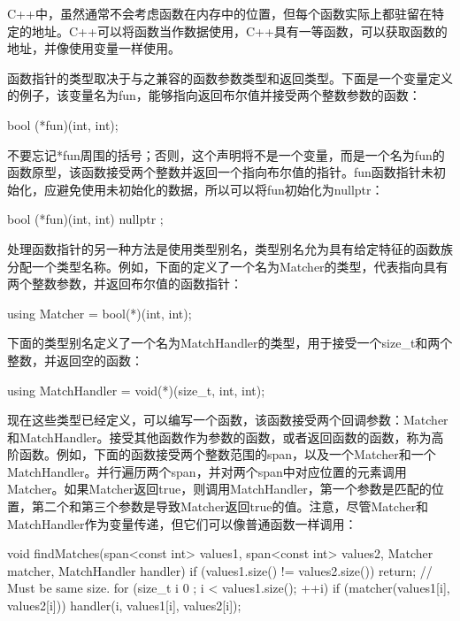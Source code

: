 
C++中，虽然通常不会考虑函数在内存中的位置，但每个函数实际上都驻留在特定的地址。C++可以将函数当作数据使用，C++具有一等函数，可以获取函数的地址，并像使用变量一样使用。

函数指针的类型取决于与之兼容的函数参数类型和返回类型。下面是一个变量定义的例子，该变量名为fun，能够指向返回布尔值并接受两个整数参数的函数：

\begin{cpp}
bool (*fun)(int, int);
\end{cpp}

不要忘记*fun周围的括号；否则，这个声明将不是一个变量，而是一个名为fun的函数原型，该函数接受两个整数并返回一个指向布尔值的指针。fun函数指针未初始化，应避免使用未初始化的数据，所以可以将fun初始化为nullptr：

\begin{cpp}
bool (*fun)(int, int) { nullptr };
\end{cpp}


处理函数指针的另一种方法是使用类型别名，类型别名允为具有给定特征的函数族分配一个类型名称。例如，下面的定义了一个名为Matcher的类型，代表指向具有两个整数参数，并返回布尔值的函数指针：

\begin{cpp}
using Matcher = bool(*)(int, int);
\end{cpp}

下面的类型别名定义了一个名为MatchHandler的类型，用于接受一个size\_t和两个整数，并返回空的函数：

\begin{cpp}
using MatchHandler = void(*)(size_t, int, int);
\end{cpp}

现在这些类型已经定义，可以编写一个函数，该函数接受两个回调参数：Matcher和MatchHandler。接受其他函数作为参数的函数，或者返回函数的函数，称为高阶函数。例如，下面的函数接受两个整数范围的span，以及一个Matcher和一个MatchHandler。并行遍历两个span，并对两个span中对应位置的元素调用Matcher。如果Matcher返回true，则调用MatchHandler，第一个参数是匹配的位置，第二个和第三个参数是导致Matcher返回true的值。注意，尽管Matcher和MatchHandler作为变量传递，但它们可以像普通函数一样调用：

\begin{cpp}
void findMatches(span<const int> values1, span<const int> values2,
Matcher matcher, MatchHandler handler)
{
    if (values1.size() != values2.size()) { return; } // Must be same size.
    for (size_t i { 0 }; i < values1.size(); ++i) {
        if (matcher(values1[i], values2[i])) {
            handler(i, values1[i], values2[i]);
        }
    }
}
\end{cpp}

